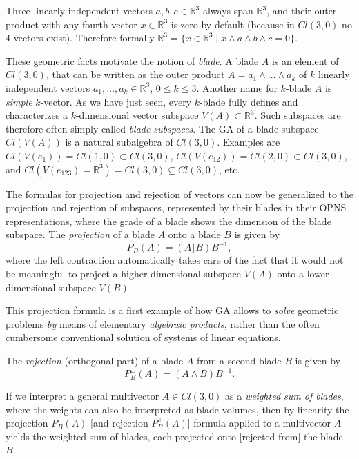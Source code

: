 \documentclass[cameraready]{jcmsi}%
\newcommand{\R}{\mathbb{R}}
\newcommand{\be}{\begin{equation}}
\newcommand{\ee}{\end{equation}}
\begin{document}
Three linearly independent vectors $a,b,c \in \R^3$ always span $\R^3$, and their outer product with any fourth vector $x\in \R^3$ is zero by default (because in $Cl(3,0)$ no 4-vectors exist). Therefore formally $\R^3 = \{x\in \R^3 \mid x \wedge a \wedge b \wedge c = 0\}$.

These geometric facts motivate the notion of \textit{blade}. A blade $A$ is an element of $Cl(3,0)$, that can be written as the outer product $A=a_1\wedge \ldots \wedge a_k$ of $k$ linearly independent vectors $a_1, \ldots , a_k \in \R^3$, $0 \leq k \leq 3$. Another name for $k$-blade $A$ is \textit{simple} $k$-vector. As we have just seen, every $k$-blade fully defines and characterizes a $k$-dimensional vector subspace $V(A)\subset \R^3$. Such subspaces are therefore often simply called \textit{blade subspaces}. The GA of a blade subspace $Cl(V(A))$ is a natural subalgebra of $Cl(3,0)$. Examples are $Cl(V(e_1)) = Cl(1,0) \subset Cl(3,0)$, 
$Cl(V(e_{12})) = Cl(2,0) \subset Cl(3,0)$, and $Cl(V(e_{123})=\R^3) = Cl(3,0) \subseteq Cl(3,0)$, etc. 

The formulas for projection and rejection of vectors can now be generalized to the projection and rejection of subspaces, represented by their blades in their OPNS representations, where the grade of a blade shows the dimension of the blade subspace. The \textit{projection} of a blade $A$ onto a blade $B$ is given by
\be 
  P_B(A) = (A\rfloor B)B^{-1},
  \label{eq:proj}
\ee 
where the left contraction automatically takes care of the fact that it would not be meaningful to project a higher dimensional subspace $V(A)$ onto a lower dimensional subspace $V(B)$. 

This projection formula is a first example of how GA allows to \textit{solve} geometric problems \textit{by} means of elementary \textit{algebraic products}, rather than the often cumbersome conventional solution of systems of linear equations. 

The \textit{rejection} (orthogonal part) of a blade $A$ from a second blade $B$ is given by
\be 
  P^{\perp}_B(A) = (A\wedge B)B^{-1}.
  \label{eq:rej}  
\ee  

If we interpret a general multivector $A\in Cl(3,0)$ as a \textit{weighted sum of blades}, where the weights can also be interpreted as blade volumes, then by linearity the projection $P_B(A)$ [and rejection $P^{\perp}_B(A)$] formula applied to a multivector $A$ yields the weighted sum of blades, each projected onto [rejected from] the blade $B$. 
\end{document}
